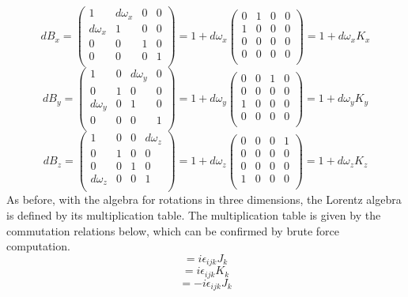 \begin{equation}
dB_x = 
\begin{pmatrix}
1 & d\omega_x & 0 & 0 \\
d\omega_x & 1 & 0 & 0 \\
0 & 0 & 1 & 0 \\
0 & 0 & 0 & 1 \\
\end{pmatrix}
= 1 + d\omega_x 
\begin{pmatrix}
0 & 1 & 0 & 0 \\
1 & 0 & 0 & 0 \\
0 & 0 & 0 & 0 \\
0 & 0 & 0 & 0 \\
\end{pmatrix}
= 1 + d\omega_x K_x
\end{equation}
\begin{equation}
dB_y = 
\begin{pmatrix}
1 & 0 & d\omega_y & 0 \\
0 & 1 & 0 & 0 \\
d\omega_y & 0 & 1 & 0 \\
0 & 0 & 0 & 1 \\
\end{pmatrix}
= 1 + d\omega_y
\begin{pmatrix}
0 & 0 & 1 & 0 \\
0 & 0 & 0 & 0 \\
1 & 0 & 0 & 0 \\
0 & 0 & 0 & 0 \\
\end{pmatrix}
= 1 + d\omega_y K_y
\end{equation}
\begin{equation}
dB_z = 
\begin{pmatrix}
1 & 0 & 0 & d\omega_z \\
0 & 1 & 0 & 0 \\
0 & 0 & 1 & 0 \\
d\omega_z & 0 & 0 & 1 \\
\end{pmatrix}
= 1 + d\omega_z
\begin{pmatrix}
0 & 0 & 0 & 1 \\
0 & 0 & 0 & 0 \\
0 & 0 & 0 & 0 \\
1 & 0 & 0 & 0 \\
\end{pmatrix}
= 1 + d\omega_z K_z
\end{equation}
As before, with the algebra for rotations in three dimensions, the Lorentz algebra is defined by its multiplication table. The multiplication table is given by the commutation relations below, which can be confirmed by brute force computation.  
\begin{equation}
[J_i, J_j] = i\epsilon_{ijk}J_k
\end{equation}
\begin{equation}
[J_i, K_j] = i\epsilon_{ijk}K_k
\end{equation}
\begin{equation}
[K_i, K_j] = -i\epsilon_{ijk}J_k
\end{equation}


